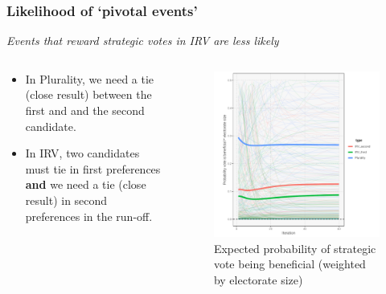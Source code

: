 \documentclass[10pt, en-GB]{beamer}
\begin{document}
\begin{frame}[t]\frametitle{Likelihood of `pivotal events'}
    
\emph{Events that reward strategic votes in IRV are less likely}


\begin{columns}[T] %
\begin{column}{.48\textwidth}
\begin{itemize}
	\item In Plurality, we need a tie (close result) between the first and and the second candidate.
	\item In IRV, two candidates must tie in first preferences \textbf{and} we need a tie (close result) in second preferences in the run-off.
\end{itemize}
\end{column}%
\hfill%
\begin{column}{.48\textwidth}
\begin{figure}[tb]
	\centering
	\includegraphics[width = \textwidth]{pres_fig/conj1.pdf}
	\caption{Expected probability of strategic vote being beneficial (weighted by electorate size)}
	\label{fig:conj1}
\end{figure}

\end{column}%
\end{columns}

\end{frame}
\end{document}
